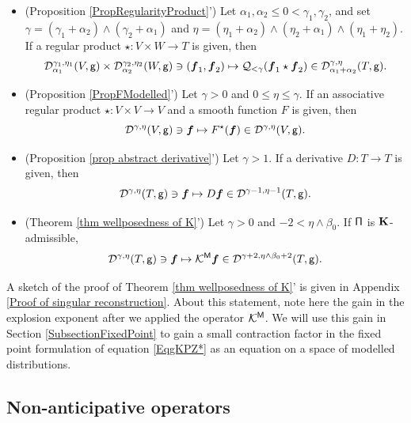 \documentclass[10pt, reqno]{amsart}
\numberwithin{subsection}{section}
\numberwithin{subsubsection}{subsection}
\numberwithin{equation}{section} %
\theoremstyle{mystyle}
\theoremstyle{mystyle2}
\theoremstyle{mystyle3}
\newcommand{\bsf}{\boldsymbol{f}}
\newcommand{\mcD}{\mathcal{D}}
\newcommand{\mcK}{\mathcal{K}}
\newcommand{\mcQ}{\mathcal{Q}}
\begin{document}
\begin{itemize}
\setlength{\itemsep}{0.1cm}
	\item (Proposition \ref{PropRegularityProduct}')
	Let $\alpha_1,\alpha_2\le0<\gamma_1,\gamma_2$, and set $\gamma=(\gamma_1+\alpha_2)\wedge(\gamma_2+\alpha_1)$ and $\eta=(\eta_1+\alpha_2)\wedge(\eta_2+\alpha_1)\wedge(\eta_1+\eta_2)$.
If a regular product $\star:V\times W\to T$ is given, then
\begin{align*}
\mcD_{\alpha_1}^{\gamma_1,\eta_1}(V,{\sf g})\times\mcD_{\alpha_2}^{\gamma_2,\eta_2}(W,{\sf g})
\ni(\bsf_1,\bsf_2)
\mapsto \mcQ_{<\gamma}(\bsf_1\star\bsf_2)\in
\mcD_{\alpha_1+\alpha_2}^{\gamma, \eta}(T,{\sf g}).
\end{align*}
	
	\item (Proposition \ref{PropFModelled}')
Let $\gamma>0$ and $0\le\eta\le\gamma$. If an associative regular product $\star:V\times V\to V$ and a smooth function $F$ is given, then
$$
\mcD^{\gamma,\eta}(V,{\sf g})\ni\bsf \mapsto F^\star(\bsf)\in\mcD^{\gamma,\eta}(V,{\sf g}).   \vspace{0.1cm}
$$

	\item (Proposition \ref{prop abstract derivative}')
Let $\gamma>1$. If a derivative $D:T\to T$ is given, then
$$
\mcD^{\gamma,\eta}(T,{\sf g})\ni\bsf \mapsto D\bsf\in\mcD^{\gamma-1,\eta-1}(T,{\sf g}).   \vspace{0.1cm}
$$

	\item (Theorem \ref{thm wellposedness of K}')
Let $\gamma>0$ and $-2<\eta\wedge\beta_0$. If ${\sf\Pi}$ is ${\bf K}$-admissible, 
$$
\mcD^{\gamma,\eta}(T,{\sf g})\ni\bsf \mapsto \mcK^{\sf M}\bsf\in\mcD^{\gamma+2,\eta\wedge\beta_0+2}(T,{\sf g}).
$$
\end{itemize}
A sketch of the proof of Theorem \ref{thm wellposedness of K}' is given in Appendix {\sf \ref{Proof of singular reconstruction}}. About this statement, note here the gain in the explosion exponent after we applied the operator $\mcK^{\sf M}$. We will use this gain in Section \ref{SubsectionFixedPoint} to gain a small contraction factor in the fixed point formulation of equation \eqref{EqgKPZ*} as an equation on a space of modelled distributions.


\bigskip



\subsection{Non-anticipative operators}
\label{SubsectionNonAnticipative}
\end{document}
